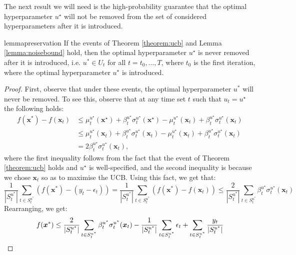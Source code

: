 \documentclass{article}
\theoremstyle{plain}
\theoremstyle{definition}
\theoremstyle{remark}
\theoremstyle{plain}
\begin{document}
The next result we will need is the high-probability guarantee that the optimal hyperparameter $u^\star$ will not be removed from the set of considered hyperparameters after it is introduced.


\begin{restatable}[]{lemma}{preservation} \label{lemma:preservation}
    If the events of Theorem \ref{theorem:ucb} and Lemma \ref{lemma:noisebound} hold, then the optimal hyperparameter $u^\star$ is never removed after it is introduced, i.e. $u^* \in U_{t}$ for all $t=t_0, \dots, T$, where $t_0$ is the first iteration, where the  optimal  hyperparameter $u^\star$ is introduced.
\end{restatable}

\begin{proof}
First, observe that under these events, the optimal hyperparameter $u^*$ will never be removed. To see this, observe  that at any time set $t$ such that $u_t = u^\star$ the following holds:
\begin{align*}
    f(\bm{x}^*) - f(\bm{x}_t) &\le \mu_t^{u^\star}(\bm{x}^\star) + \beta_t^{u^\star} \sigma_t^{u^\star}(\bm{x}^\star) - \mu_t^{u^\star}(\bm{x}_t) + \beta_t^{u^\star} \sigma_t^{u^\star}(\bm{x}_t) \\
    &\le \mu_t^{u^\star}(\bm{x}_t) + \beta_t^{u^\star} \sigma_t^{u^\star}(\bm{x}_t) - \mu_t^{u^\star}(\bm{x}_t) + \beta_t^{u^\star} \sigma_t^{u^\star}(\bm{x}_t) \\
    &= 2 \beta_t^{u^\star}\sigma_t^{u^\star}(\bm{x}_t),
\end{align*}
where the first inequality follows from the fact that the event of Theorem \ref{theorem:ucb} holds and $u^\star$ is well-specified, and the second inequality is because we chose $\bm{x}_t$ so as to maximise the UCB.
Using this fact, we get that:
\begin{equation*}
   \frac{1}{|S_t^{u^*}|} \sum_{t \in S_t^{u^*}}\left( f(\bm{x}^*) - (y_t - \epsilon_t) \right) = \frac{1}{|S_t^{u^*}|}\sum_{t \in S_t^{u^*}}  \left(f(\bm{x}^*) - f(\bm{x}_t) \right)  \le \frac{2}{|S_t^{u^*}|}  \sum_{t \in S_t^{u^*}} \beta_t^{u^\star}\sigma_t^{u^\star}(\bm{x}_t)
\end{equation*}
Rearranging, we get:
\begin{align} \label{eq:rb_lhs}
    f(\bm{x}^*) &\le \frac{2}{|S_t^{u^*}|}  \sum_{t \in S_t^{u^*}} \beta_t^{u^\star}\sigma_t^{u^\star}(\bm{x}_t) - \frac{1}{|S_t^{u^*}|}\sum_{t \in S_t^{u^*}} \epsilon_t +  \sum_{t \in S_t^{u^*}} \frac{y_t}{|S_t^{u^*}|} \notag \\ 

\end{align}
\end{proof}
\end{document}
